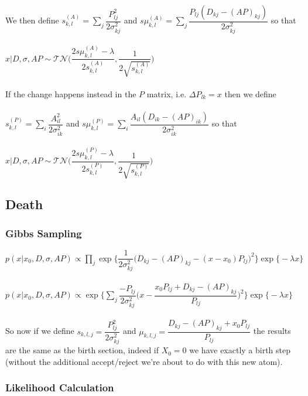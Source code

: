 \documentclass[]{article}
\begin{document}
\\
We then define $s_{k,l}^{(A)} = \sum_j \dfrac{P_{lj}^2}{2\sigma_{kj}^2}$ and $s\mu_{k,l}^{(A)} = \sum_j \dfrac{P_{lj}(D_{kj} - (AP)_{kj})}{2\sigma_{kj}^2}$ so that\\
\\
$x|D,\sigma,AP \sim \mathcal{TN}\biggr(\dfrac{2 s\mu_{k,l}^{(A)} - \lambda}{2s_{k,l}^{(A)}}, \dfrac{1}{2\sqrt{s_{k,l}^{(A)}}}\biggr)$\\
\\
If the change happens instead in the $P$ matrix, i.e. $\Delta P_{lk} = x$ then we define\\
\\
$s_{k,l}^{(P)} = \sum_i \dfrac{A_{il}^2}{2\sigma_{ik}^2}$ and $s\mu_{k,l}^{(P)} = \sum_i \dfrac{A_{il}(D_{ik} - (AP)_{ik})}{2\sigma_{ik}^2}$ so that\\
\\
$x|D,\sigma,AP \sim \mathcal{TN}\biggr(\dfrac{2 s\mu_{k,l}^{(P)} - \lambda}{2s_{k,l}^{(P)}}, \dfrac{1}{2\sqrt{s_{k,l}^{(P)}}}\biggr)$

\subsection{Death}

\subsubsection{Gibbs Sampling}

$p(x|x_0,D,\sigma,AP) \propto \prod_j \exp\biggr\{\dfrac{1}{2\sigma_{kj}^2}\biggr(D_{kj} - (AP)_{kj} - (x-x_0)P_{lj}\biggr)^2\biggr\}\exp\biggr\{-\lambda x\biggr\}$\\
\\
$p(x|x_0,D,\sigma,AP) \propto \exp\biggr\{\sum_j \dfrac{-P_{lj}}{2\sigma_{kj}^2}\biggr(x - \dfrac{x_0P_{lj} + D_{kj} - (AP)_{kj}}{P_{lj}}\biggr)^2\biggr\}\exp\biggr\{-\lambda x\biggr\}$\\
\\
So now if we define $s_{k,l,j}=\dfrac{P_{lj}^2}{2\sigma_{kj}^2}$ and $\mu_{k,l,j}=\dfrac{D_{kj} - (AP)_{kj} + x_0P_{lj}}{P_{lj}}$ the results are the same as the birth section, indeed if $X_0 = 0$ we have exactly a birth step (without the additional accept/reject we're about to do with this new atom).

\subsubsection{Likelihood Calculation}
\end{document}

